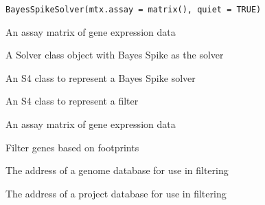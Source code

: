 \documentclass[a4paper]{book}
\begin{document}
%
\begin{Usage}
\begin{verbatim}
BayesSpikeSolver(mtx.assay = matrix(), quiet = TRUE)
\end{verbatim}
\end{Usage}
%
\begin{Arguments}
\begin{ldescription}
\item[\code{mtx.assay}] An assay matrix of gene expression data
\end{ldescription}
\end{Arguments}
%
\begin{Value}
A Solver class object with Bayes Spike as the solver
\end{Value}
%
\begin{Description}\relax
An S4 class to represent a Bayes Spike solver
\end{Description}
%
\begin{Description}\relax
An S4 class to represent a filter
\end{Description}
%
\begin{Arguments}
\begin{ldescription}
\item[\code{mtx.assay}] An assay matrix of gene expression data
\end{ldescription}
\end{Arguments}
%
\begin{Description}\relax
Filter genes based on footprints
\end{Description}
%
\begin{Arguments}
\begin{ldescription}
\item[\code{genome.db}] The address of a genome database for use in filtering

\item[\code{project.db}] The address of a project database for use in filtering
\end{ldescription}
\end{Arguments}
\end{document}
